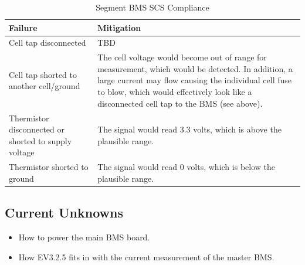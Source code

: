\documentclass[12pt]{article}
\begin{document}
\begin{table}[H]
  \centering
  \begin{tabular}{|p{0.3\linewidth}|p{0.7\linewidth}|}
    \hline
    \textbf{Failure} & \textbf{Mitigation} \\
    \hline
    Cell tap disconnected & TBD \\
    \hline
    Cell tap shorted to another cell/ground & The cell voltage would become out of range for measurement, which would be detected.
                                              In addition, a large current may flow causing the individual cell fuse to blow, which would effectively look like a disconnected cell tap to the BMS (see above). \\
    \hline
    Thermistor disconnected or shorted to supply voltage & The signal would read 3.3 volts, which is above the plausible range. \\
    \hline
    Thermistor shorted to ground & The signal would read 0 volts, which is below the plausible range. \\
    \hline
  \end{tabular}
  \caption{Segment BMS SCS Compliance}
  \label{tbl:segment-bms-scs-compliance}
\end{table}

\subsection{Current Unknowns}
\begin{itemize}
\item How to power the main BMS board.
\item How EV3.2.5 fits in with the current measurement of the master BMS.
\end{itemize}

\begin{versionhistory}
\end{versionhistory}
\end{document}
